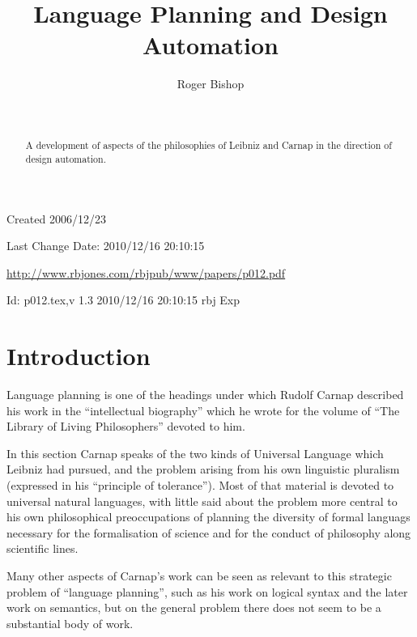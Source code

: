\documentclass[numreferences]{rbjk}
\begin{document}
                                                                                   
\begin{article}
\begin{opening}  
\title{Language Planning and Design Automation}
\author{Roger Bishop }
\date{$ $\ $ $}

\begin{abstract}
A development of aspects of the philosophies of Leibniz and Carnap in the direction of design automation.
\end{abstract}

\end{opening}

\vfill

\begin{centering}
\footnotesize{
Created 2006/12/23

Last Change $ $Date: 2010/12/16 20:10:15 $ $

\href{http://www.rbjones.com/rbjpub/www/papers/p012.pdf}{http://www.rbjones.com/rbjpub/www/papers/p012.pdf}

$ $Id: p012.tex,v 1.3 2010/12/16 20:10:15 rbj Exp $ $\\

}%
\end{centering}

\newpage
\setcounter{tocdepth}{4}
{\parskip-0pt\tableofcontents}

\section{Introduction}

Language planning is one of the headings under which Rudolf Carnap described his work in the ``intellectual biography''\cite{carnap63} which he wrote for the volume of ``The Library of Living Philosophers'' devoted to him\cite{carnap63a}.

In this section Carnap speaks of the two kinds of Universal Language which Leibniz had pursued, and the problem arising from his own linguistic pluralism (expressed in his ``principle of tolerance'').
Most of that material is devoted to universal natural languages, with little said about the problem more central to his own philosophical preoccupations of planning the diversity of formal languags necessary for the formalisation of science and for the conduct of philosophy along scientific lines.

Many other aspects of Carnap's work can be seen as relevant to this strategic problem of ``language planning'', such as his work on logical syntax and the later work on semantics, but on the general problem there does not seem to be a substantial body of work.


\end{article}
\end{document}
